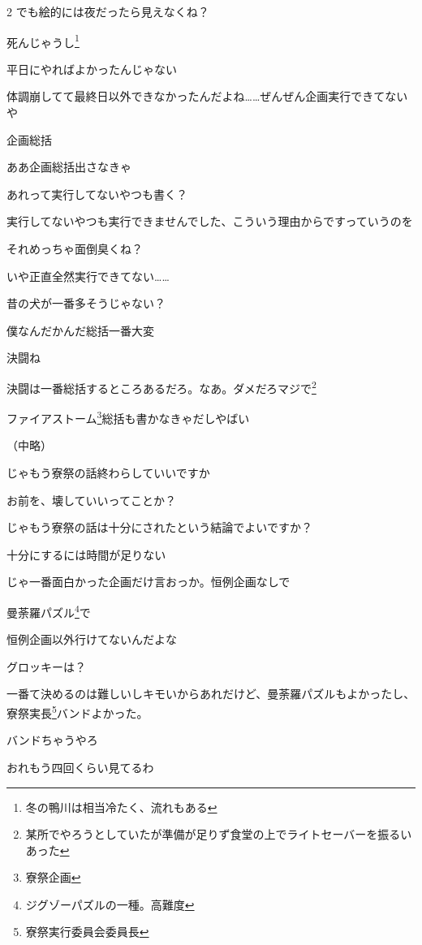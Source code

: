 \begin{multicols}{2}
 でも絵的には夜だったら見えなくね？

 死んじゃうし\footnote{冬の鴨川は相当冷たく、流れもある}

 平日にやればよかったんじゃない

 体調崩してて最終日以外できなかったんだよね……ぜんぜん企画実行できてないや

 企画総括

 ああ企画総括出さなきゃ

 あれって実行してないやつも書く？

 実行してないやつも実行できませんでした、こういう理由からですっていうのを

 それめっちゃ面倒臭くね？

 いや正直全然実行できてない……

 昔の犬が一番多そうじゃない？

 僕なんだかんだ総括一番大変

 決闘ね

 決闘は一番総括するところあるだろ。なあ。ダメだろマジで\footnote{某所でやろうとしていたが準備が足りず食堂の上でライトセーバーを振るいあった}

 ファイアストーム\footnote{寮祭企画}総括も書かなきゃだしやばい

（中略）

 じゃもう寮祭の話終わらしていいですか

 お前を、壊していいってことか？

 じゃもう寮祭の話は十分にされたという結論でよいですか？

 十分にするには時間が足りない

 じゃ一番面白かった企画だけ言おっか。恒例企画なしで

 曼荼羅パズル\footnote{ジグゾーパズルの一種。高難度}で

 恒例企画以外行けてないんだよな

 グロッキーは？

 一番て決めるのは難しいしキモいからあれだけど、曼荼羅パズルもよかったし、寮祭実長\footnote{寮祭実行委員会委員長}バンドよかった。

 バンドちゃうやろ

 おれもう四回くらい見てるわ


\end{multicols}
